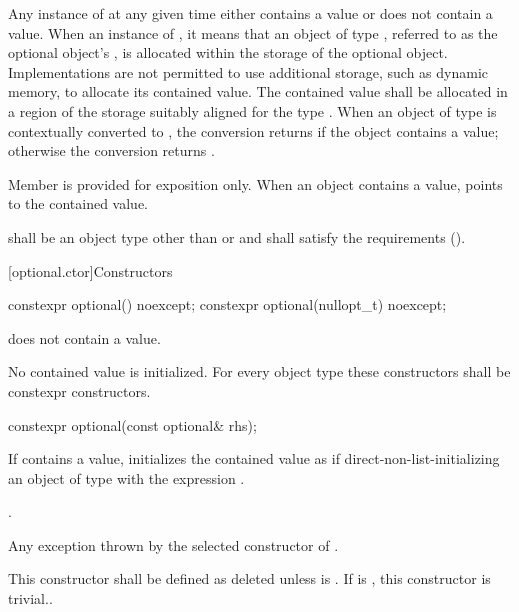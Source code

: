 \pnum
Any instance of  at any given time either contains a value or does not contain a value.
When an instance of  ,
it means that an object of type , referred to as the optional object's ,
is allocated within the storage of the optional object.
Implementations are not permitted to use additional storage, such as dynamic memory, to allocate its contained value.
The contained value shall be allocated in a region of the  storage suitably aligned for the type .
When an object of type  is contextually converted to ,
the conversion returns  if the object contains a value;
otherwise the conversion returns .

\pnum
Member  is provided for exposition only. When an  object contains a value,  points to the contained value.

\pnum
{} shall be an object type
other than \cv{}  or \cv{} 
and shall satisfy the  requirements ().

[optional.ctor]{Constructors}

%
\begin{itemdecl}
constexpr optional() noexcept;
constexpr optional(nullopt_t) noexcept;
\end{itemdecl}

\begin{itemdescr}
\pnum
\ensures
{} does not contain a value.

\pnum
\remarks
No contained value is initialized.
For every object type  these constructors shall be constexpr constructors.
\end{itemdescr}

%
\begin{itemdecl}
constexpr optional(const optional& rhs);
\end{itemdecl}

\begin{itemdescr}
\pnum
\effects
If  contains a value, initializes the contained value as if
direct-non-list-initializing an object of type  with the expression .

\pnum
\ensures
{}.

\pnum
\throws
Any exception thrown by the selected constructor of .

\pnum
\remarks
This constructor shall be defined as deleted unless
 is .
If  is ,
this constructor is trivial..
\end{itemdescr}

